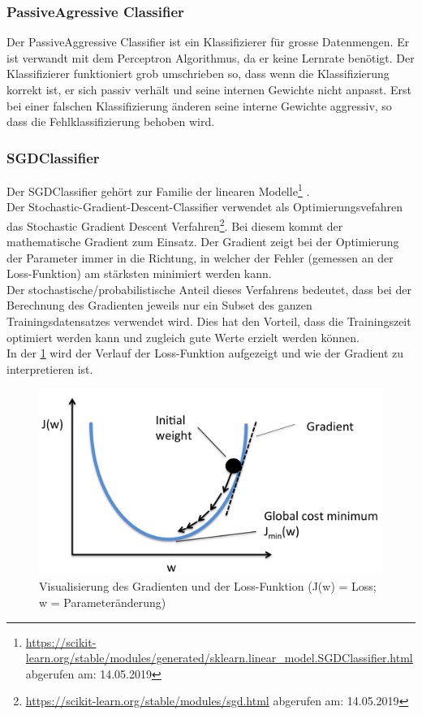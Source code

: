 \subsubsection{PassiveAgressive Classifier}
Der PassiveAggressive Classifier ist ein Klassifizierer für grosse Datenmengen.
Er ist verwandt mit dem Perceptron Algorithmus, da er keine Lernrate benötigt.
Der Klassifizierer funktioniert grob umschrieben so, dass wenn die Klassifizierung korrekt ist, er sich passiv verhält und seine internen Gewichte nicht anpasst.
Erst bei einer falschen Klassifizierung änderen seine interne Gewichte aggressiv, so dass die Fehlklassifizierung behoben wird. \cite{crammer2006online}
\subsubsection{SGDClassifier}
Der SGDClassifier gehört zur Familie der linearen Modelle\footnote{\url{https://scikit-learn.org/stable/modules/generated/sklearn.linear_model.SGDClassifier.html} abgerufen am: 14.05.2019} \cite{scikit-learn}.\\
Der \glqq Stochastic-Gradient-Descent-Classifier\grqq{} verwendet als Optimierungsvefahren das \glqq Stochastic Gradient Descent\grqq{} Verfahren\footnote{\url{https://scikit-learn.org/stable/modules/sgd.html} abgerufen am: 14.05.2019}.
Bei diesem kommt der mathematische Gradient zum Einsatz.
Der Gradient zeigt bei der Optimierung der Parameter immer in die Richtung, in welcher der Fehler (gemessen an der Loss-Funktion) am stärksten minimiert werden kann.\\
Der stochastische/probabilistische Anteil dieses Verfahrens bedeutet, dass bei der Berechnung des Gradienten jeweils nur ein Subset des ganzen Trainingsdatensatzes verwendet wird.
Dies hat den Vorteil, dass die Trainingszeit optimiert werden kann und zugleich gute Werte erzielt werden können\cite{lecun2012efficient}.\\
In der \cref{fig:sgd} wird der Verlauf der Loss-Funktion aufgezeigt und wie der Gradient zu interpretieren ist.
\begin{figure}[H]
	\centering	
	\includegraphics[width=0.7\columnwidth,keepaspectratio]{img/sgd.png}
	\caption{Visualisierung des Gradienten und der Loss-Funktion (J(w) = Loss; w = Parameteränderung)}
	\label{fig:sgd}
\end{figure}
